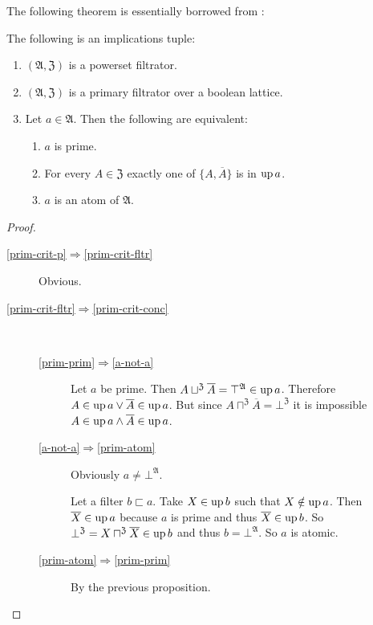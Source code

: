The following theorem is essentially borrowed from \cite{stone-spaces}:
\begin{thm}
\label{f-prime-crit}The following is an implications tuple:
\begin{enumerate}
\item \label{prim-crit-p}$(\mathfrak{A},\mathfrak{Z})$ is a powerset filtrator.
\item \label{prim-crit-fltr}$(\mathfrak{A},\mathfrak{Z})$ is a primary
filtrator over a boolean lattice.
\item \label{prim-crit-conc}Let $a\in\mathfrak{A}$. Then the following
are equivalent:

\begin{enumerate}
\item \label{prim-prim}$a$ is prime.
\item \label{a-not-a}For every $A\in\mathfrak{Z}$ exactly one of $\{A,\overline{A}\}$
is in $\operatorname{up} a$.
\item \label{prim-atom}$a$ is an atom of $\mathfrak{A}$.
\end{enumerate}
\end{enumerate}
\end{thm}
\begin{proof}
~
\begin{description}
\item [{\ref{prim-crit-p}$\Rightarrow$\ref{prim-crit-fltr}}] Obvious.
\item [{\ref{prim-crit-fltr}$\Rightarrow$\ref{prim-crit-conc}}] ~

\begin{description}
\item [{\ref{prim-prim}$\Rightarrow$\ref{a-not-a}}] Let $a$ be prime.
Then $A\sqcup^{\mathfrak{Z}}\overline{A}=\top^{\mathfrak{A}}\in\operatorname{up} a$.
Therefore $A\in\operatorname{up} a\lor\overline{A}\in\operatorname{up} a$. But since $A\sqcap^{\mathfrak{Z}}\overline{A}=\bot^{\mathfrak{Z}}$
it is impossible $A\in\operatorname{up} a\land\overline{A}\in\operatorname{up} a$.
\item [{\ref{a-not-a}$\Rightarrow$\ref{prim-atom}}] Obviously $a\ne\bot^{\mathfrak{A}}$.

Let a filter $b\sqsubset a$. Take $X\in\operatorname{up} b$ such that $X\notin\operatorname{up} a$. Then $\overline{X}\in\operatorname{up} a$ because $a$ is prime and thus
$\overline{X}\in\operatorname{up} b$. So
$\bot^{\mathfrak{Z}}=X\sqcap^{\mathfrak{Z}}\overline{X}\in\operatorname{up} b$
and thus $b=\bot^{\mathfrak{A}}$. So $a$ is atomic.
\item [{\ref{prim-atom}$\Rightarrow$\ref{prim-prim}}] By the previous
proposition.
\end{description}
\end{description}
\end{proof}


